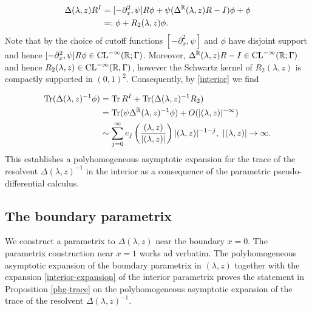 \begin{equation}
 \begin{split}
  \Delta(\lambda,z) R^I &= [-\partial_x^2, \psi] R \phi + \psi (\Delta^{\mathbb{R}}(\lambda,z)R-I) \phi + \phi \\
          &=: \phi + R_2(\lambda,z)\phi.
 \end{split}
\end{equation}
Note that by the choice of cutoff functions $[-\partial_x^2, \psi]$ 
and $\phi$ have disjoint support and hence 
$[-\partial_x^2, \psi] R \phi \in \operatorname{CL}^{-\infty}(\mathbb{R};\Gamma)$.
Moreover, $\Delta^{\mathbb{R}}(\lambda,z)R-I\in \operatorname{CL}^{-\infty}(\mathbb{R};\Gamma)$ and hence 
$R_2(\lambda,z)\in \operatorname{CL}^{-\infty}(\mathbb{R},\Gamma)$, however the Schwartz kernel of $R_2(\lambda,z)$
is compactly supported in $(0,1)^2$. Consequently, by \eqref{interior} we find

\begin{equation}
\label{interior-expansion}
 \begin{split}
  \operatorname{Tr} (\Delta(\lambda,z)^{-1} \phi) 
&= \operatorname{Tr} R^I + \operatorname{Tr} (\Delta(\lambda,z)^{-1}R_2) \\
&= \operatorname{Tr} (\psi \Delta^{\mathbb{R}}(\lambda,z)^{-1} \phi) + O(|(\lambda,z)|^{-\infty})\\
&\sim \sum_{j=0}^\infty e_j \left(\frac{(\lambda,z)}{|(\lambda,z)|}\right)
|(\lambda,z)|^{-1-j}, \ |(\lambda,z)| \to \infty.
 \end{split}
\end{equation}
This establishes a polyhomogeneous asymptotic 
expansion for the trace of the resolvent $\Delta(\lambda,z)^{-1}$ 
in the interior as a consequence of the parametric pseudo-
differential calculus. 

\subsection{The boundary parametrix}

We construct a parametrix to $\Delta(\lambda,z)$ near the boundary $x=0$.
The parametrix construction near $x=1$ works ad verbatim.
The polyhomogeneous asymptotic expansion of the boundary parametrix in $(\lambda,z)$ 
together with the expansion \eqref{interior-expansion} 
of the interior parametrix proves the statement in Proposition \ref{phg-trace}
on the polyhomogeneous asymptotic expansion of the trace of 
the resolvent $\Delta(\lambda,z)^{-1}$.

